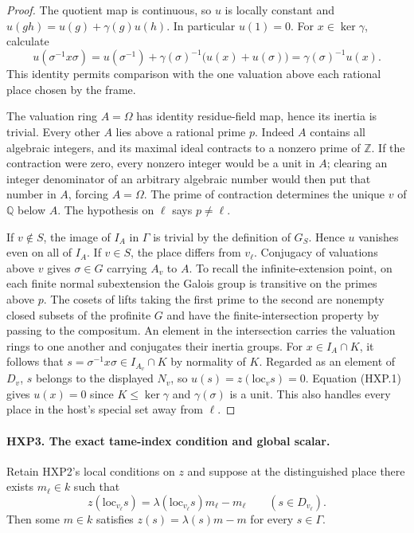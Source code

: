 \begin{proof}
The quotient map is continuous, so $u$ is locally constant and
$u(gh)=u(g)+\gamma(g)u(h)$. In particular $u(1)=0$. For
$x\in\ker\gamma$, calculate
\[
   u(\sigma^{-1}x\sigma)
     =u(\sigma^{-1})+\gamma(\sigma)^{-1}
            \big(u(x)+u(\sigma)\big)
     =\gamma(\sigma)^{-1}u(x).                         \tag{HXP.1}
\]
This identity permits comparison with the one valuation above
each rational place chosen by the frame.

The valuation ring $A=\Omega$ has identity residue-field map, hence its
inertia is trivial. Every other $A$ lies above a rational prime $p$.
Indeed $A$ contains all algebraic integers, and its maximal ideal
contracts to a nonzero prime of $\mathbb Z$. If the contraction were
zero, every nonzero integer would be a unit in $A$; clearing an
integer denominator of an arbitrary algebraic number would then put
that number in $A$, forcing $A=\Omega$. The prime of contraction
determines the unique $v$ of $\mathbb Q$ below $A$. The hypothesis on
$\ell$ says $p\ne\ell$.

If $v\notin S$, the image of $I_A$ in $\Gamma$ is trivial by the
definition of $G_S$. Hence $u$ vanishes even on all of $I_A$.
If $v\in S$, the place differs from $v_\ell$. Conjugacy of valuations
above $v$ gives $\sigma\in G$ carrying $A_v$ to $A$. To recall
the infinite-extension point, on each finite normal subextension the
Galois group is transitive on the primes above $p$. The cosets of
lifts taking the first prime to the second are nonempty closed
subsets of the profinite $G$ and have the finite-intersection
property by passing to the compositum. An element in the intersection
carries the valuation rings to one another and conjugates their
inertia groups. For $x\in I_A\cap K$, it follows that
$s=\sigma^{-1}x\sigma\in I_{A_v}\cap K$ by normality of $K$.
Regarded as an element of $D_v$, $s$ belongs to the displayed $N_v$,
so $u(s)=z(\mathrm{loc}_v s)=0$. Equation (HXP.1) gives $u(x)=0$
since $K\le\ker\gamma$ and $\gamma(\sigma)$ is a unit. This also
handles every place in the host's special set away from $\ell$.
\end{proof}

\paragraph{HXP3. The exact tame-index condition and global scalar.}
\label{claim:HXP3}
Retain HXP2's local conditions on $z$ and suppose at the
distinguished place there exists $m_\ell\in k$ such that
\[
 z(\mathrm{loc}_{v_\ell}s)=\lambda(\mathrm{loc}_{v_\ell}s)m_\ell-m_\ell
                  \qquad(s\in D_{v_\ell}).
\]
Then some $m\in k$ satisfies
$z(s)=\lambda(s)m-m$ for every $s\in\Gamma$.

